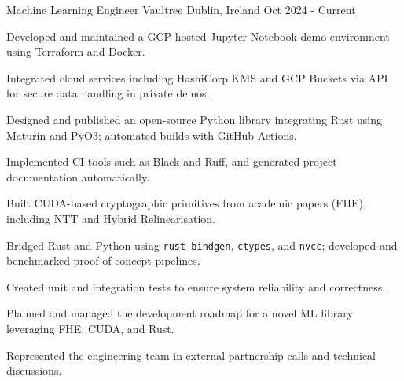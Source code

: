 

\begin{cventries}

\cventry
  {Machine Learning Engineer} %
  {Vaultree} %
  {Dublin, Ireland} %
  {Oct 2024 - Current} %
  {
    \begin{cvitems} %
      \item {Developed and maintained a GCP-hosted Jupyter Notebook demo environment using Terraform and Docker.}
      \item {Integrated cloud services including HashiCorp KMS and GCP Buckets via API for secure data handling in private demos.}
      \item {Designed and published an open-source Python library integrating Rust using Maturin and PyO3; automated builds with GitHub Actions.}
      \item {Implemented CI tools such as Black and Ruff, and generated project documentation automatically.}
      \item {Built CUDA-based cryptographic primitives from academic papers (FHE), including NTT and Hybrid Relinearisation.}
      \item {Bridged Rust and Python using \texttt{rust-bindgen}, \texttt{ctypes}, and \texttt{nvcc}; developed and benchmarked proof-of-concept pipelines.}
      \item {Created unit and integration tests to ensure system reliability and correctness.}
      \item {Planned and managed the development roadmap for a novel ML library leveraging FHE, CUDA, and Rust.}
      \item {Represented the engineering team in external partnership calls and technical discussions.}
    \end{cvitems}
  }


\end{cventries}
